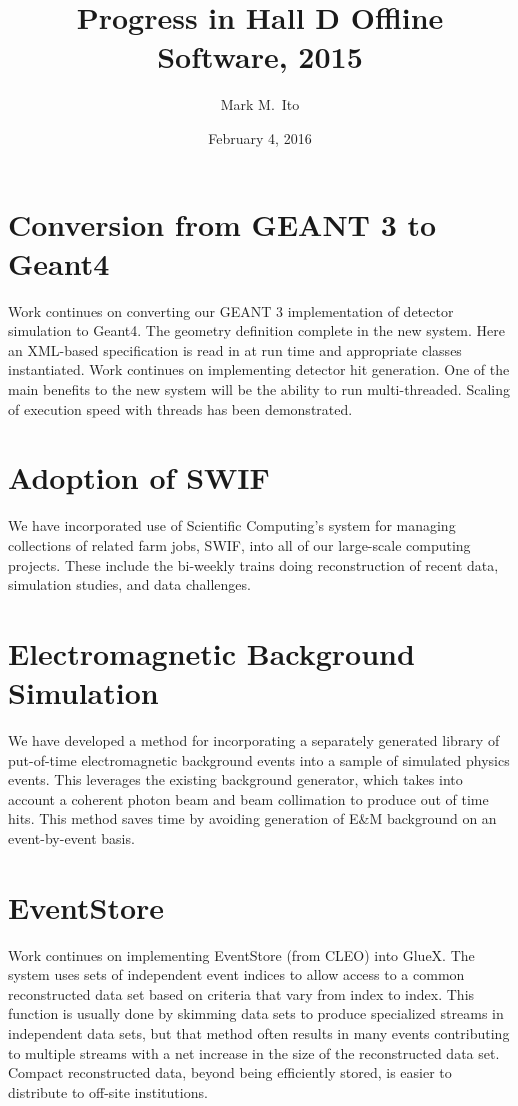 \documentclass[12pt]{article}
\title{Progress in Hall D Offline Software, 2015}
\author{Mark M.\ Ito}
\date{February 4, 2016}
\begin{document}
\maketitle

\section{Conversion from GEANT 3 to Geant4}

Work continues on converting our GEANT 3 implementation of detector
simulation to Geant4. The geometry definition complete in the new
system. Here an XML-based specification is read in at run time and
appropriate classes instantiated. Work continues on implementing
detector hit generation. One of the main benefits to the new system
will be the ability to run multi-threaded. Scaling of execution speed
with threads has been demonstrated.

\section{Adoption of SWIF}

We have incorporated use of Scientific Computing's system for managing
collections of related farm jobs, SWIF, into all of our large-scale
computing projects. These include the bi-weekly trains doing reconstruction of
recent data, simulation studies, and data challenges.

\section{Electromagnetic Background Simulation}

We have developed a method for incorporating a separately generated
library of put-of-time electromagnetic background events into a sample
of simulated physics events. This leverages the existing background
generator, which takes into account a coherent photon beam and beam
collimation to produce out of time hits. This method saves time by
avoiding generation of E\&M background on an event-by-event basis.

\section{EventStore}

Work continues on implementing EventStore (from CLEO) into GlueX.
The system uses sets of independent event indices to
allow access to a common reconstructed data set based on criteria that
vary from index to index. This function is usually done by skimming
data sets to produce specialized streams in independent data sets, but
that method often results in many events contributing to multiple
streams with a net increase in the size of the reconstructed data
set. Compact reconstructed data, beyond being efficiently stored, is
easier to distribute to off-site institutions.
\end{document}
